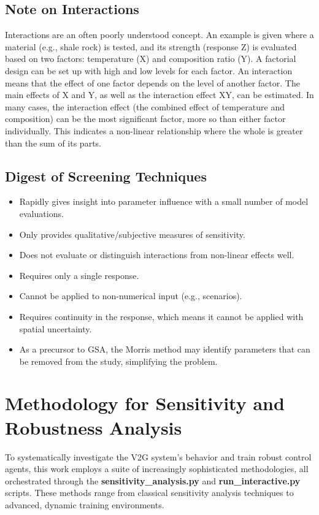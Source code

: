 \subsection{Note on Interactions}
Interactions are an often poorly understood concept. An example is given where a material (e.g., shale rock) is tested, and its strength (response Z) is evaluated based on two factors: temperature (X) and composition ratio (Y). A factorial design can be set up with high and low levels for each factor.
\noindent
An interaction means that the effect of one factor depends on the level of another factor. The main effects of X and Y, as well as the interaction effect XY, can be estimated. In many cases, the interaction effect (the combined effect of temperature and composition) can be the most significant factor, more so than either factor individually. This indicates a non-linear relationship where the whole is greater than the sum of its parts.

\subsection*{Digest of Screening Techniques}
\begin{itemize}
    \item Rapidly gives insight into parameter influence with a small number of model evaluations.
    \item Only provides qualitative/subjective measures of sensitivity.
    \item Does not evaluate or distinguish interactions from non-linear effects well.
    \item Requires only a single response.
    \item Cannot be applied to non-numerical input (e.g., scenarios).
    \item Requires continuity in the response, which means it cannot be applied with spatial uncertainty.
    \item As a precursor to GSA, the Morris method may identify parameters that can be removed from the study, simplifying the problem.
\end{itemize}


\section{Methodology for Sensitivity and Robustness Analysis}
\label{sec:sa_methodology}
\noindent
To systematically investigate the V2G system's behavior and train robust control agents, this work employs a suite of increasingly sophisticated methodologies, all orchestrated through the \textbf{sensitivity\_analysis.py} and \textbf{run\_interactive.py} scripts. These methods range from classical sensitivity analysis techniques to advanced, dynamic training environments.

